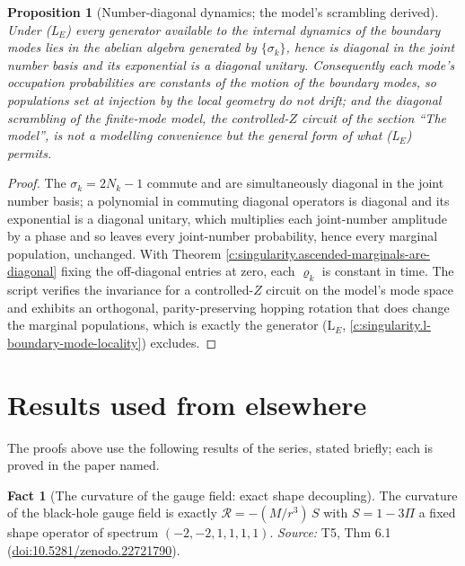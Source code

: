 \documentclass[11pt]{article}
\newtheorem{proposition}[theorem]{Proposition}
\theoremstyle{definition}
\newtheorem{fact}[theorem]{Fact}
\theoremstyle{plain}
\begin{document}
\begin{proposition}[Number-diagonal dynamics; the model's scrambling derived]\label{c:singularity.number-diagonal-dynamics-models-scrambling-derived}
Under (L$_E$) every generator available to the internal dynamics of the boundary modes lies in the abelian algebra generated by $\{\sigma_k\}$, hence is diagonal in the joint number basis and its exponential is a diagonal unitary. Consequently each mode's occupation probabilities are constants of the motion of the boundary modes, so populations set at injection by the local geometry do not drift; and the diagonal scrambling of the finite-mode model, the controlled-$Z$ circuit of the section ``The model'', is not a modelling convenience but the general form of what (L$_E$) permits.
\end{proposition}
\begin{proof}
The $\sigma_k = 2N_k - 1$ commute and are simultaneously diagonal in the joint number basis; a polynomial in commuting diagonal operators is diagonal and its exponential is a diagonal unitary, which multiplies each joint-number amplitude by a phase and so leaves every joint-number probability, hence every marginal population, unchanged. With Theorem \ref{c:singularity.ascended-marginals-are-diagonal} fixing the off-diagonal entries at zero, each $\varrho_k$ is constant in time. The script verifies the invariance for a controlled-$Z$ circuit on the model's mode space and exhibits an orthogonal, parity-preserving hopping rotation that does change the marginal populations, which is exactly the generator (L$_E$, \ref{c:singularity.l-boundary-mode-locality}) excludes.

\end{proof}

\section{Results used from elsewhere}
The proofs above use the following results of the series, stated briefly; each is proved in the paper named.

\begin{fact}[The curvature of the gauge field: exact shape decoupling]\label{c:singularity.curvature-gauge-field-exact-shape-decoupling}
The curvature of the black-hole gauge field is exactly $\mathcal{R} = -(M/r^3)\,S$ with $S = 1 - 3\Pi$ a fixed shape operator of spectrum $(-2,-2,1,1,1,1)$.
\emph{Source:} T5, Thm 6.1 (\href{https://doi.org/10.5281/zenodo.22721790}{doi:10.5281/zenodo.22721790}).
\end{fact}
\end{document}
